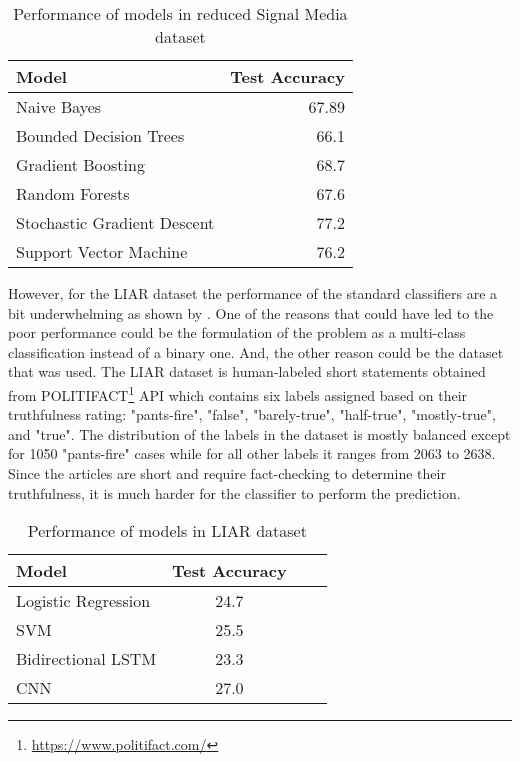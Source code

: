 \begin{table}[h]
\begin{center}
\caption{Performance of models in reduced Signal Media dataset}
\label{tbl:signal_media_performance}
\begin{tabular}{lr}
\toprule 
Model&Test Accuracy\\
\midrule 
Naive Bayes&67.89\\
Bounded Decision Trees&66.1\\
Gradient Boosting&68.7\\
Random Forests&67.6\\
Stochastic Gradient Descent&77.2\\
Support Vector Machine&76.2\\
\bottomrule
\end{tabular}
\end{center}
\end{table}

However, for the LIAR dataset the performance of the standard classifiers are a bit underwhelming as shown by  \cite{wang2017liar}.  One of the reasons that could have led to the poor performance could be the formulation of the problem as a multi-class classification instead of a binary one. And, the other reason could be the dataset that was used. The LIAR dataset is human-labeled short statements obtained from POLITIFACT\footnote{\url{https://www.politifact.com/}} API which contains six labels assigned based on their truthfulness rating: "pants-fire", "false", "barely-true", "half-true", "mostly-true", and "true". The distribution of the labels in the dataset is mostly balanced except for 1050 "pants-fire" cases while for all other labels it ranges from 2063 to 2638. Since the articles are short and require fact-checking to determine their truthfulness, it is much harder for the classifier to perform the prediction.

\begin{table}[h]
\begin{center}
\caption{Performance of models in LIAR dataset}
\label{tbl:liar_performance}
\begin{tabular}{lccc}
\toprule 
Model&Test Accuracy\\
\midrule 
Logistic Regression&24.7\\
SVM&25.5\\
Bidirectional LSTM&23.3\\
CNN&27.0\\
\bottomrule
\end{tabular}
\end{center}
\end{table}

